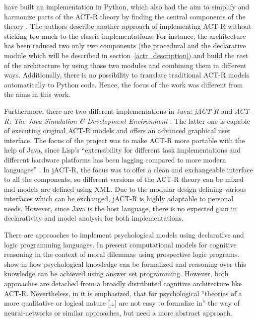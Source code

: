 \citeauthor{stewart_deconstructing_2007} have built an implementation in Python, which also had the aim to simplify and harmonize parts of the ACT-R theory by finding the central components of the theory \cites{stewart_deconstructing_2006,stewart_deconstructing_2007}. The authors describe another approach of implementing ACT-R without sticking too much to the classic implementations. For instance, the architecture has been reduced two only two components (the procedural and the declarative module which will be described in section~\ref{actr_description}) and build the rest of the architecture by using those two modules and combining them in different ways. Additionally, there is no possibility to translate traditional ACT-R models automatically to Python code. Hence, the focus of the work was different from the aims in this work.

Furthermore, there are two different implementations in Java: \emph{jACT-R} \cite{jactr} and \emph{ACT-R: The Java Simulation \& Development Environment} \cite{java_actr}. The latter one is capable of executing original ACT-R models and offers an advanced graphical user interface. The focus of the project was to make ACT-R more portable with the help of Java, since Lisp's ``extensibility for different task implementations and different hardware platforms has been lagging compared to more modern languages'' \cite{java_actr_benefits}. In jACT-R, the focus was to offer a clean and exchangeable interface to all the components, so different versions of the ACT-R theory can be mixed \cite{jactr_benefits} and models are defined using XML. Due to the modular design defining various interfaces which can be exchanged, jACT-R is highly adaptable to personal needs. However, since Java is the host language, there is no expected gain in declarativity and model analysis for both implementations.

There are approaches to implement psychological models using declarative and logic programming languages. In \cite{pereira_modellingmorality_2007} \citeauthor{pereira_modellingmorality_2007} present computational models for cognitive reasoning in the context of moral dilemmas using prospective logic programs. \citeauthor{balduccini_formalization_2010} show in \cite{balduccini_formalization_2010} how psychological knowledge can be formalized and reasoning over this knowledge can be achieved using answer set programming. However, both approaches are detached from a broadly distributed cognitive architecture like ACT-R. Nevertheless, in \cite[726]{balduccini_formalization_2010} it is emphasized, that for psychological ``theories of a more qualitative or logical nature [\dots] are not easy to formalize in'' the way of neural-networks or similar approaches, but need a more abstract approach.

